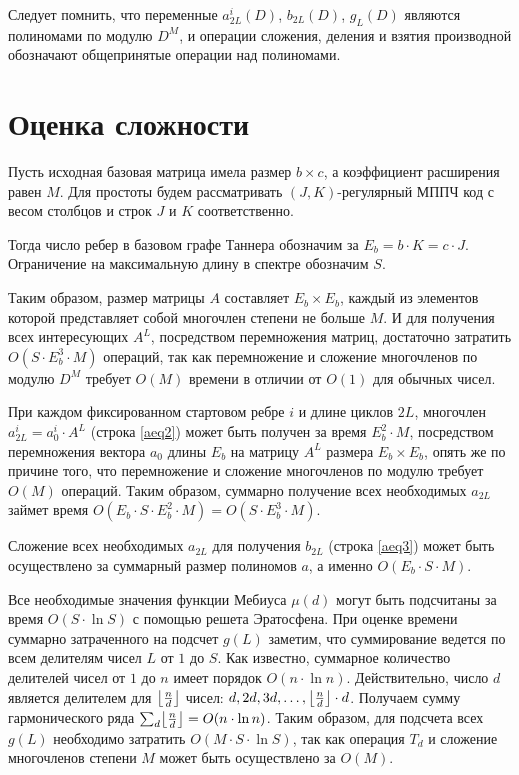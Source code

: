 Следует помнить, что переменные $a_{2L}^i(D)$, $b_{2L}(D)$, $g_L(D)$
являются полиномами по модулю $D^M$, и операции сложения, деления
и взятия производной обозначают общепринятые операции над
полиномами.

\section{Оценка сложности}

 Пусть исходная базовая  матрица имела размер $b \times c$, а коэффициент расширения равен $M$.
Для простоты будем рассматривать $(J,K)$-регулярный МППЧ код с 
весом столбцов и строк $J$ и $K$ соответственно. 

Тогда число ребер в базовом графе Таннера обозначим за $E_b=b \cdot K = c \cdot J$.
Ограничение на максимальную длину в спектре обозначим $S$.

Таким образом, размер матрицы $A$ составляет $E_b \times E_b$, каждый из элементов которой представляет
собой многочлен степени не больше $M$. И для получения
всех интересующих $A^L$, посредством перемножения матриц,
достаточно затратить $O(S \cdot E_b^3 \cdot M)$ операций, так как перемножение и сложение многочленов по модулю $D^M$
требует $O(M)$ времени в отличии от $O(1)$ для обычных чисел.

При каждом фиксированном стартовом ребре $i$ и длине циклов $2L$, многочлен $a_{2L}^i=a_0^i \cdot A^L$ (строка \ref{aeq2})
может быть получен за время $E_b^2 \cdot M$, посредством перемножения вектора $a_0$ длины $E_b$ на матрицу
$A^L$ размера $E_b \times E_b$, опять же по причине того, что перемножение и сложение многочленов по модулю 
требует $O(M)$ операций. Таким образом, суммарно получение всех необходимых $a_{2L}$ займет
 время $O(E_b \cdot S \cdot E_b^2 \cdot M) = O(S \cdot E_b^3 \cdot M)$.

Сложение всех необходимых $a_{2L}$ для получения $b_{2L}$ (строка \ref{aeq3}) может быть осуществлено за суммарный размер 
полиномов $a$, а именно $O(E_b \cdot S \cdot M)$.

Все необходимые значения функции Мебиуса $\mu(d)$ могут быть подсчитаны за время $O(S \cdot \ln S)$ с
помощью решета Эратосфена. При оценке времени суммарно затраченного на подсчет $g(L)$ заметим,
 что суммирование ведется по всем делителям чисел $L$ от $1$ до $S$. Как известно, суммарное количество
делителей чисел от $1$ до $n$ имеет порядок $O(n \cdot \ln n)$. Действительно, число $d$ является 
делителем для $\floor*{\frac{n}{d}}$ чисел: $d, 2d, 3d, \ldots, \floor*{\frac{n}{d}} \cdot d$. Получаем сумму гармонического ряда
 $\sum_d \floor*{\frac{n}{d}} = O(n \cdot \ln n)$. Таким образом, для подсчета всех $g(L)$ необходимо затратить $O(M \cdot S \cdot \ln S)$,
так как операция $T_d$ и сложение многочленов степени $M$ может быть осуществлено за $O(M)$.

